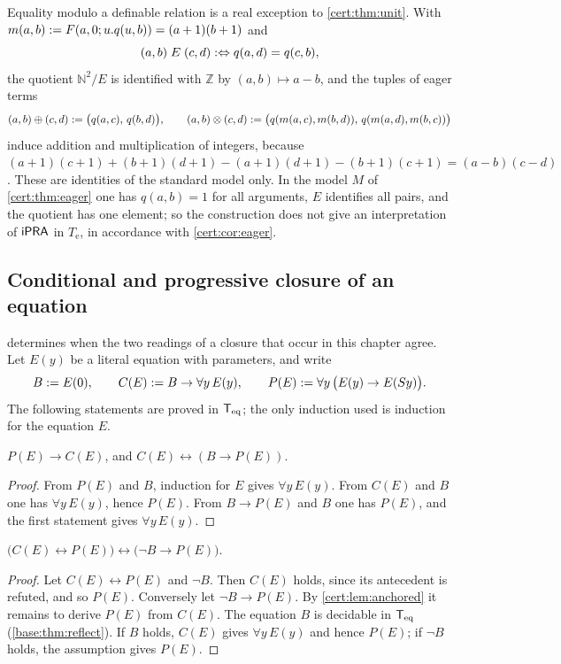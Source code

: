 Equality modulo a definable relation is a real exception to
\cref{cert:thm:unit}. With $m(a,b)\mathrel{:=} F(a,0;u.q(u,b))=(a+1)(b+1)$ and
\[
(a,b)\mathrel{E}(c,d)\mathrel{:\Leftrightarrow} q(a,d)=q(c,b),
\]
the quotient $\mathbb N^{2}/E$ is identified with $\mathbb Z$ by
$(a,b)\mapsto a-b$, and the tuples of eager terms
\[
(a,b)\oplus(c,d)\mathrel{:=}\bigl(q(a,c),\,q(b,d)\bigr),\qquad
(a,b)\otimes(c,d)\mathrel{:=}\bigl(q(m(a,c),m(b,d)),\,q(m(a,d),m(b,c))\bigr)
\]
induce addition and multiplication of integers, because
$(a+1)(c+1)+(b+1)(d+1)-(a+1)(d+1)-(b+1)(c+1)=(a-b)(c-d)$. These are
identities of the standard model only. In the model $M$ of
\cref{cert:thm:eager} one has $q(a,b)=1$ for all arguments, $E$ identifies all
pairs, and the quotient has one element; so the construction does not give an
interpretation of $\mathsf{iPRA}$ in $T_{\mathrm e}$, in accordance with
\cref{cert:cor:eager}.

\subsection{Conditional and progressive closure of an equation}

 determines when the two readings of a closure that
occur in this chapter agree. Let $E(y)$ be a literal equation with
parameters, and write
\[
B\mathrel{:=} E(0),\qquad C(E)\mathrel{:=} B\to\forall y\,E(y),\qquad
P(E)\mathrel{:=}\forall y\,\bigl(E(y)\to E(S y)\bigr).
\]
The following statements are proved in $\mathsf{T}_{\mathrm{eq}}$; the only induction used is
induction for the equation $E$.

\begin{lemma}\label{cert:lem:anchored}
$P(E)\to C(E)$, and $C(E)\leftrightarrow(B\to P(E))$.
\end{lemma}
\begin{proof}
From $P(E)$ and $B$, induction for $E$ gives $\forall y\,E(y)$. From $C(E)$
and $B$ one has $\forall y\,E(y)$, hence $P(E)$. From $B\to P(E)$ and $B$ one
has $P(E)$, and the first statement gives $\forall y\,E(y)$.
\end{proof}

\begin{theorem}\label{cert:thm:criterion}
$\bigl(C(E)\leftrightarrow P(E)\bigr)\leftrightarrow\bigl(\neg B\to P(E)\bigr)$.
\end{theorem}
\begin{proof}
Let $C(E)\leftrightarrow P(E)$ and $\neg B$. Then $C(E)$ holds, since its
antecedent is refuted, and so $P(E)$. Conversely let $\neg B\to P(E)$. By
\cref{cert:lem:anchored} it remains to derive $P(E)$ from $C(E)$. The equation
$B$ is decidable in $\mathsf{T}_{\mathrm{eq}}$ (\cref{base:thm:reflect}). If $B$ holds, $C(E)$
gives $\forall y\,E(y)$ and hence $P(E)$; if $\neg B$ holds, the assumption
gives $P(E)$.
\end{proof}

